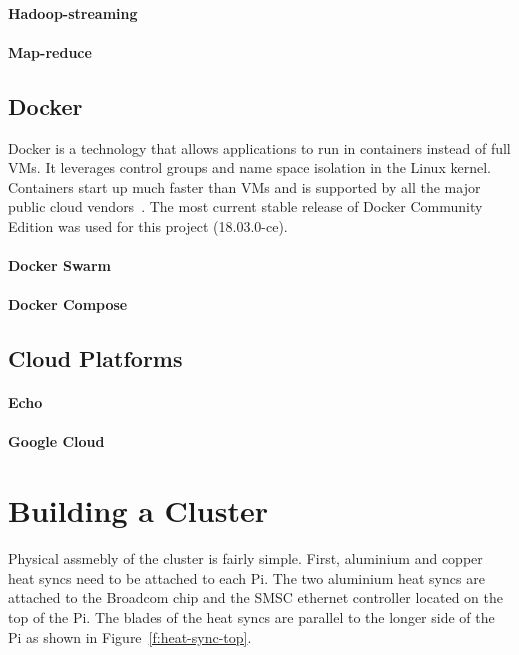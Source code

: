\paragraph{Hadoop-streaming}
\paragraph{Map-reduce}


\subsection{Docker}
Docker is a technology that allows applications to run in containers
instead of full VMs. It leverages control groups and name space
isolation in the Linux kernel. Containers start up much faster than
VMs and is supported by all the major public cloud
vendors~\cite{Foster:2017:CCS:3158276}. The most current stable
release of Docker Community Edition was used for this project
(18.03.0-ce).
\paragraph{Docker Swarm}
\paragraph{Docker Compose}

\subsection{Cloud Platforms}
\paragraph{Echo}
\paragraph{Google Cloud}

\section{Building a Cluster}
  Physical assmebly of the cluster is fairly
simple. First, aluminium and copper heat syncs need to be attached to
each Pi. The two aluminium heat syncs are attached to the Broadcom
chip and the SMSC ethernet controller located on the top of the
Pi. The blades of the heat syncs are parallel to the longer side of
the Pi as shown in Figure~\ref{f:heat-sync-top}.


